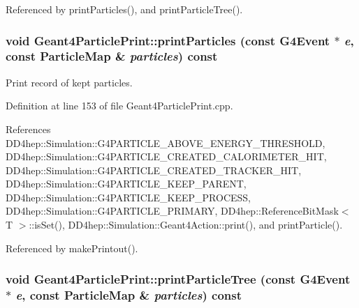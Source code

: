 Referenced by printParticles(), and printParticleTree().\hypertarget{class_d_d4hep_1_1_simulation_1_1_geant4_particle_print_a674a1bd5268f594db4ef4a2697df6813}{
\subsubsection[{printParticles}]{\setlength{\rightskip}{0pt plus 5cm}void Geant4ParticlePrint::printParticles (const G4Event $\ast$ {\em e}, \/  const {\bf ParticleMap} \& {\em particles}) const}}
\label{class_d_d4hep_1_1_simulation_1_1_geant4_particle_print_a674a1bd5268f594db4ef4a2697df6813}


Print record of kept particles. 

Definition at line 153 of file Geant4ParticlePrint.cpp.

References DD4hep::Simulation::G4PARTICLE\_\-ABOVE\_\-ENERGY\_\-THRESHOLD, DD4hep::Simulation::G4PARTICLE\_\-CREATED\_\-CALORIMETER\_\-HIT, DD4hep::Simulation::G4PARTICLE\_\-CREATED\_\-TRACKER\_\-HIT, DD4hep::Simulation::G4PARTICLE\_\-KEEP\_\-PARENT, DD4hep::Simulation::G4PARTICLE\_\-KEEP\_\-PROCESS, DD4hep::Simulation::G4PARTICLE\_\-PRIMARY, DD4hep::ReferenceBitMask$<$ T $>$::isSet(), DD4hep::Simulation::Geant4Action::print(), and printParticle().

Referenced by makePrintout().\hypertarget{class_d_d4hep_1_1_simulation_1_1_geant4_particle_print_a65b769e2ac95c58da7905668ece79987}{
\subsubsection[{printParticleTree}]{\setlength{\rightskip}{0pt plus 5cm}void Geant4ParticlePrint::printParticleTree (const G4Event $\ast$ {\em e}, \/  const {\bf ParticleMap} \& {\em particles}) const}}
\label{class_d_d4hep_1_1_simulation_1_1_geant4_particle_print_a65b769e2ac95c58da7905668ece79987}


